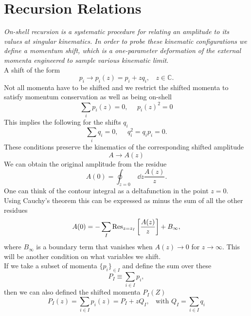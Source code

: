 \documentclass[a4paper,12pt]{article}
\begin{document}
\section{Recursion Relations}\label{sec:recursion}
\textit{On-shell recursion is a systematic procedure for relating an amplitude to its
values at singular kinematics. In order to probe these kinematic configurations we define a momentum shift, which is a one-parameter deformation of
the external momenta engineered to sample various kinematic limit}. \\
%
%
A shift of the form
\begin{equation}
p_i\to p_i(z)=p_i+zq_i,~~~~z\in \mathds{C}.
\end{equation}
%
Not all momenta have to be shifted and we restrict the shifted momenta to satisfy momentum conservation as well as being on-shell
%
\begin{equation}
\sum_ip_i(z)=0,~~~~~~p_i(z)^2=0
\end{equation}
%
This implies the following for the shifts $q_i$
%
\begin{equation}
\sum_iq_i=0,~~~~~~q_i^2=q_ip_i=0.
\end{equation}
%
These conditions preserve the kinematics of the corresponding shifted amplitude
%
\begin{equation}
A\to A(z)
\end{equation}
%
We can obtain the original amplitude from the residue
%
\begin{equation}
A(0)=\oint_{z=0}\:\dd z \frac{A(z)}{z}.
\end{equation}
%
One can think of the contour integral as a deltafunction in the point $z=0$.\\
%
Using Cauchy's theorem this can be expressed as minus the sum of all the other residues 
%
\begin{equation}
A(0)=-\sum_I \Res_{z=z_I}\left[\frac{A(z)}{z}\right] +B_\infty,
\end{equation}
%
where $B_{\infty}$ is a boundary term that vanishes when $A(z)\to 0$ for $z\to \infty$. This will be another condition on what variables we shift. \\
%
If we take a subset of momenta $\{p_i\}_{\in I}$ and define the sum over these
%
\begin{equation}
P_I\equiv\sum_{i\in I} p_i,
\end{equation}
%
then we can also defined the shifted momenta $P_I(Z)$
%
\begin{equation}
P_I(z)=\sum_{i\in I} p_i(z)=P_I+zQ_I,~~~~\text{with } Q_I=\sum_{i\in I} q_i
\end{equation}
\end{document}
